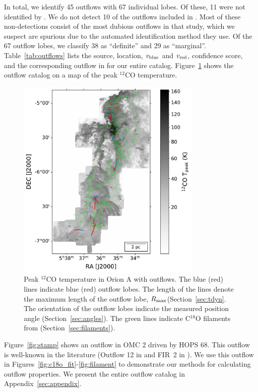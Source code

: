 \documentclass[twocolumn]{aastex63}
\newcommand{\example}{HOPS 68}
\newcommand{\co}[1][]{\ensuremath{^{#1}}CO}
\begin{document}
In total, we identify 45 outflows with 67 individual lobes. Of these, 11 were not identified by \citet{Tanabe:submitted}. We do not detect 10 of the outflows included in \citet{Tanabe:submitted}. Most of these non-detections consist of the most dubious outflows in that study, which we suspect are spurious due to the automated identification method they use. Of the 67 outflow lobes, we classify 38 as ``definite'' and 29 as ``marginal''. Table~\ref{tab:outflows} lists the source, location, $v_{\rm blue}$ and $v_{\rm red}$, confidence score, and the corresponding outflow in \citet{Tanabe:submitted} for our entire catalog. Figure~\ref{fig:overview} shows the outflow catalog on a map of the peak \co[12]{} temperature.

\begin{figure}
\centering
\includegraphics[width=0.8\textwidth]{overview.pdf}
\caption{Peak \co[12]{} temperature in Orion A with outflows. The blue (red) lines indicate blue (red) outflow lobes. The length of the lines denote the maximum length of the outflow lobe, $R_{\rm max}$(Section~\ref{sec:tdyn}. The orientation of the outflow lobes indicate the measured position angle (Section~\ref{sec:angles}). The green lines indicate C$^{18}$O filaments from \citet{Suri19} (Section~\ref{sec:filaments}). \label{fig:overview}}
\end{figure}

Figure~\ref{fig:stamp} shows an outflow in OMC 2 driven by \example{}. This outflow is well-known in the literature (Outflow 12 in \citealp{Tanabe:submitted} and FIR~2 in \citealp{Takahashi08}). We use this outflow in Figures~\ref{fig:c18o_fit}-\ref{fig:filament} to demonstrate our methods for calculating outflow properties. We present the entire outflow catalog in Appendix~\ref{sec:appendix}.
\end{document}
